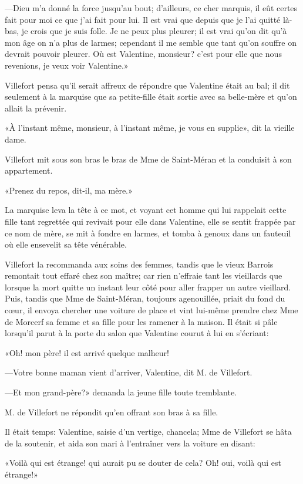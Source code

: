 —Dieu m'a donné la force jusqu'au bout; d'ailleurs, ce cher marquis, il eût certes fait pour moi ce que j'ai fait pour lui. Il est vrai que depuis que je l'ai quitté là-bas, je crois que je suis folle. Je ne peux plus pleurer; il est vrai qu'on dit qu'à mon âge on n'a plus de larmes; cependant il me semble que tant qu'on souffre on devrait pouvoir pleurer. Où est Valentine, monsieur? c'est pour elle que nous revenions, je veux voir Valentine.» 

Villefort pensa qu'il serait affreux de répondre que Valentine était au bal; il dit seulement à la marquise que sa petite-fille était sortie avec sa belle-mère et qu'on allait la prévenir. 

«À l'instant même, monsieur, à l'instant même, je vous en supplie», dit la vieille dame. 

Villefort mit sous son bras le bras de Mme de Saint-Méran et la conduisit à son appartement. 

«Prenez du repos, dit-il, ma mère.» 

La marquise leva la tête à ce mot, et voyant cet homme qui lui rappelait cette fille tant regrettée qui revivait pour elle dans Valentine, elle se sentit frappée par ce nom de mère, se mit à fondre en larmes, et tomba à genoux dans un fauteuil où elle ensevelit sa tête vénérable. 

Villefort la recommanda aux soins des femmes, tandis que le vieux Barrois remontait tout effaré chez son maître; car rien n'effraie tant les vieillards que lorsque la mort quitte un instant leur côté pour aller frapper un autre vieillard. Puis, tandis que Mme de Saint-Méran, toujours agenouillée, priait du fond du cœur, il envoya chercher une voiture de place et vint lui-même prendre chez Mme de Morcerf sa femme et sa fille pour les ramener à la maison. Il était si pâle lorsqu'il parut à la porte du salon que Valentine courut à lui en s'écriant: 

«Oh! mon père! il est arrivé quelque malheur! 

—Votre bonne maman vient d'arriver, Valentine, dit M. de Villefort. 

—Et mon grand-père?» demanda la jeune fille toute tremblante. 

M. de Villefort ne répondit qu'en offrant son bras à sa fille. 

Il était temps: Valentine, saisie d'un vertige, chancela; Mme de Villefort se hâta de la soutenir, et aida son mari à l'entraîner vers la voiture en disant: 

«Voilà qui est étrange! qui aurait pu se douter de cela? Oh! oui, voilà qui est étrange!» 

